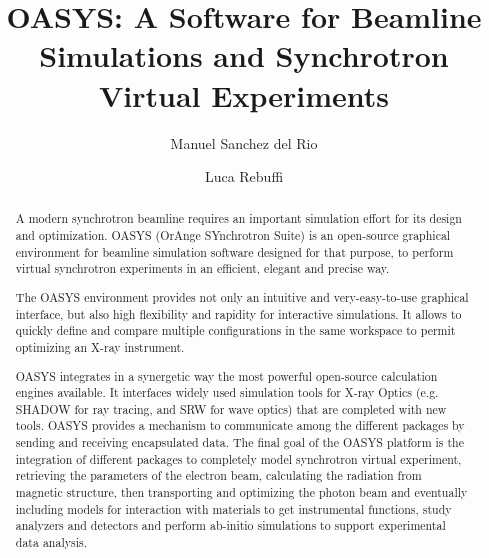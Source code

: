 \documentclass{aip-cp}
\begin{document}
\title{OASYS: A Software for Beamline Simulations and Synchrotron Virtual Experiments}

\author[aff1]{Manuel Sanchez del Rio} %
\author[aff2]{Luca Rebuffi}


\maketitle


\begin{abstract}
A modern synchrotron beamline requires an important simulation effort for its design and optimization. OASYS (OrAnge SYnchrotron Suite) is an open-source graphical environment for beamline simulation software designed for that purpose, to perform virtual synchrotron experiments in an efficient, elegant and precise way.

The OASYS environment provides not only an intuitive and very-easy-to-use graphical interface, but also high flexibility and rapidity for interactive simulations. It allows to quickly define and compare multiple configurations in the same workspace to permit optimizing an X-ray instrument. 

OASYS integrates in a synergetic way the most powerful open-source calculation engines available. It interfaces widely used simulation tools for X-ray Optics (e.g. SHADOW for ray tracing, and SRW for wave optics) that are completed with new tools. OASYS provides a mechanism to communicate among the different packages by sending and receiving encapsulated data. The final goal of the OASYS platform is the integration of different packages to completely model synchrotron virtual experiment, retrieving the parameters of the electron beam, calculating the radiation from magnetic structure, then transporting and optimizing the photon beam and eventually including models for interaction with materials to get instrumental functions, study analyzers and detectors and perform ab-initio simulations to support experimental data analysis. 
\end{abstract}
\end{document}
